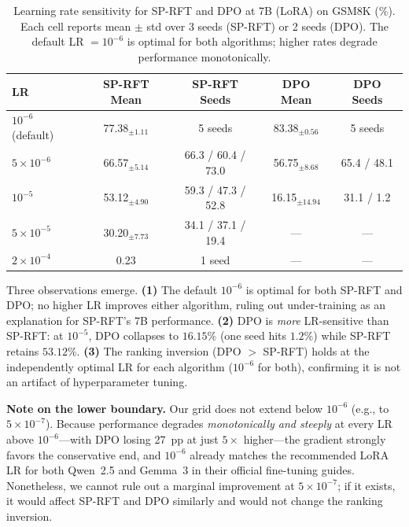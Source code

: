 \documentclass{article}
\newcommand{\sprft}{SP-RFT}
\begin{document}
\begin{table}[ht]
\centering
\caption{Learning rate sensitivity for \sprft{} and DPO at 7B (LoRA) on GSM8K (\%). Each cell reports mean $\pm$ std over 3 seeds (\sprft{}) or 2 seeds (DPO). The default LR $= 10^{-6}$ is optimal for both algorithms; higher rates degrade performance monotonically.}
\label{tab:lr_ablation}
\small
\begin{tabular}{@{}lcccc@{}}
\toprule
\textbf{LR} & \textbf{\sprft{} Mean} & \textbf{\sprft{} Seeds} & \textbf{DPO Mean} & \textbf{DPO Seeds} \\
\midrule
$10^{-6}$ (default) & 77.38$_{\pm 1.11}$ & 5 seeds & 83.38$_{\pm 0.56}$ & 5 seeds \\
$5{\times}10^{-6}$ & 66.57$_{\pm 5.14}$ & 66.3 / 60.4 / 73.0 & 56.75$_{\pm 8.68}$ & 65.4 / 48.1 \\
$10^{-5}$ & 53.12$_{\pm 4.90}$ & 59.3 / 47.3 / 52.8 & 16.15$_{\pm 14.94}$ & 31.1 / \phantom{0}1.2 \\
$5{\times}10^{-5}$ & 30.20$_{\pm 7.73}$ & 34.1 / 37.1 / 19.4 & --- & --- \\
$2{\times}10^{-4}$ & \phantom{0}0.23 & 1 seed & --- & --- \\
\bottomrule
\end{tabular}
\end{table}

Three observations emerge. \textbf{(1)} The default $10^{-6}$ is optimal for both \sprft{} and DPO; no higher LR improves either algorithm, ruling out under-training as an explanation for \sprft{}'s 7B performance. \textbf{(2)} DPO is \emph{more} LR-sensitive than \sprft{}: at $10^{-5}$, DPO collapses to $16.15\%$ (one seed hits $1.2\%$) while \sprft{} retains $53.12\%$. \textbf{(3)} The ranking inversion (DPO $>$ \sprft{}) holds at the independently optimal LR for each algorithm ($10^{-6}$ for both), confirming it is not an artifact of hyperparameter tuning.

\textbf{Note on the lower boundary.} Our grid does not extend below $10^{-6}$ (e.g., to $5{\times}10^{-7}$). Because performance degrades \emph{monotonically and steeply} at every LR above $10^{-6}$---with DPO losing 27~pp at just $5{\times}$ higher---the gradient strongly favors the conservative end, and $10^{-6}$ already matches the recommended LoRA LR for both Qwen~2.5 and Gemma~3 in their official fine-tuning guides. Nonetheless, we cannot rule out a marginal improvement at $5{\times}10^{-7}$; if it exists, it would affect \sprft{} and DPO similarly and would not change the ranking inversion.
\end{document}
